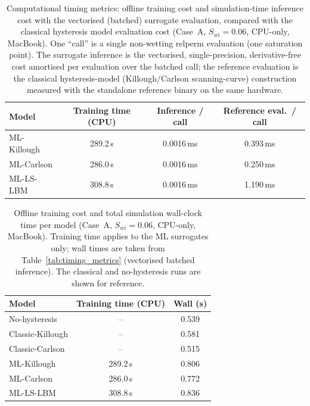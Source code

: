 \begin{table}[h]
\centering
\caption{Computational timing metrics: offline training cost and
simulation-time inference cost with the vectorised (batched) surrogate
evaluation, compared with the classical hysteresis model evaluation cost
(Case~A, $S_{wi}=0.06$, CPU-only, MacBook). One ``call'' is a single
non-wetting relperm evaluation (one saturation point). The surrogate
inference is the vectorised, single-precision, derivative-free cost amortised
per evaluation over the batched call; the reference evaluation is the
classical hysteresis-model (Killough/Carlson scanning-curve) construction
measured with the standalone reference binary on the same hardware.}
\label{tab:timing}
\begin{tabular}{lccc}
\hline
\textbf{Model} & \textbf{Training time (CPU)} & \textbf{Inference / call}
  & \textbf{Reference eval.\ / call} \\
\hline
ML-Killough & 289.2\,s & 0.0016\,ms & 0.393\,ms \\
ML-Carlson  & 286.0\,s & 0.0016\,ms & 0.250\,ms \\
ML-LS-LBM  & 308.8\,s & 0.0016\,ms & 1.190\,ms \\
\hline
\end{tabular}
\end{table}

%

\begin{table}[h]
\centering
\caption{Offline training cost and total simulation wall-clock time per
model (Case~A, $S_{wi}=0.06$, CPU-only, MacBook). Training time applies to
the ML surrogates only; wall times are taken from Table~\ref{tab:timing_metrics}
(vectorised batched inference). The classical and no-hysteresis runs are shown
for reference.}
\label{tab:training_wall}
\begin{tabular}{lcc}
\hline
\textbf{Model} & \textbf{Training time (CPU)} & \textbf{Wall (s)} \\
\hline
No-hysteresis    & --       & 0.539 \\
Classic-Killough & --       & 0.581 \\
Classic-Carlson  & --       & 0.515 \\
ML-Killough      & 289.2\,s & 0.806 \\
ML-Carlson       & 286.0\,s & 0.772 \\
ML-LS-LBM       & 308.8\,s & 0.836 \\
\hline
\end{tabular}
\end{table}

